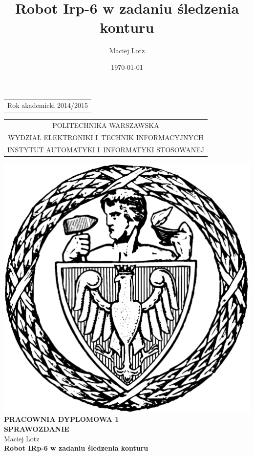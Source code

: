 \documentclass[12pt, a4paper, twoside]{book}
\author{Maciej Lotz }
\title{Robot Irp-6 w zadaniu śledzenia konturu}
\date{\today}
\begin{document}
	\sloppy
		
		
		\thispagestyle{empty}
		
		\begin{titlepage}
			\noindent
			\begin{flushright}
				\begin{tabular}[t]{r}
					\scriptsize Rok akademicki 2014/2015\\[5mm]
				\end{tabular}
			\end{flushright}
			\begin{center}
				\begin{tabular}[t]{c}
					\scriptsize POLITECHNIKA WARSZAWSKA\\
					\scriptsize WYDZIAŁ ELEKTRONIKI I~TECHNIK INFORMACYJNYCH\\
					\scriptsize INSTYTUT AUTOMATYKI I~INFORMATYKI STOSOWANEJ
				\end{tabular}
			\end{center}
			\vfill
			\begin{center}
				\resizebox{3.5cm}{!}
				{
					\includegraphics{images/logo_politechnika.pdf}
				}
				\\[5mm]\textbf{PRACOWNIA DYPLOMOWA 1}\\[3mm] \textbf{SPRAWOZDANIE} \\[15mm]
				\large Maciej Lotz\\[10mm]
				\Large \textbf{Robot \mbox{\mbox{IRp-6}} w zadaniu śledzenia konturu}
			\end{center}
			

\end{titlepage}
\end{document}
